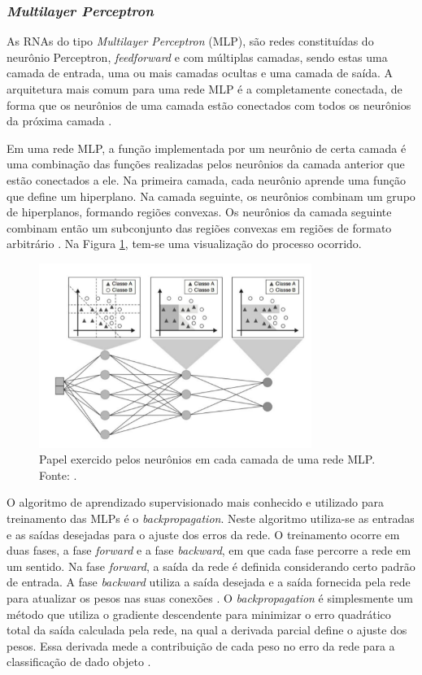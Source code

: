 \subsubsection{\emph{Multilayer Perceptron}}
\label{subsubsec:mlp}

As RNAs do tipo \emph{Multilayer Perceptron} (MLP), são redes constituídas do neurônio Perceptron, \emph{feedforward} e com múltiplas camadas, sendo estas uma camada de entrada, uma ou mais camadas ocultas e uma camada de saída. A arquitetura mais comum para uma rede MLP é a completamente conectada, de forma que os neurônios de uma camada estão conectados com todos os neurônios da próxima camada \cite{faceli}.

Em uma rede MLP, a função implementada por um neurônio de certa camada é uma combinação das funções realizadas pelos neurônios da camada anterior que estão conectados a ele. Na primeira camada, cada neurônio aprende uma função que define um hiperplano. Na camada seguinte, os neurônios combinam um grupo de hiperplanos, formando regiões convexas. Os neurônios da camada seguinte combinam então um subconjunto das regiões convexas em regiões de formato arbitrário \cite{faceli}. Na Figura \ref{fig:aprendizado-mlp}, tem-se uma visualização do processo ocorrido.


\begin{figure}[h!]
\centering
\includegraphics[height=6cm]{imgs/aprendizado-mlp}
\caption{Papel exercido pelos neurônios em cada camada de uma rede MLP. Fonte: \cite{faceli}.}
\label{fig:aprendizado-mlp}
\end{figure}

O algoritmo de aprendizado supervisionado mais conhecido e utilizado para treinamento das MLPs é o \emph{backpropagation}. Neste algoritmo utiliza-se as entradas e as saídas desejadas para o ajuste dos erros da rede. O treinamento ocorre em duas fases, a fase \emph{forward} e a fase \emph{backward}, em que cada fase percorre a rede em um sentido. Na fase \emph{forward}, a saída da rede é definida considerando certo padrão de entrada. A fase \emph{backward} utiliza a saída desejada e a saída fornecida pela rede para atualizar os pesos nas suas conexões \cite{braga}. O \emph{backpropagation} é simplesmente um método que utiliza o gradiente descendente para minimizar o erro quadrático total da saída calculada pela rede, na qual a derivada parcial define o ajuste dos pesos. Essa derivada mede a contribuição de cada peso no erro da rede para a classificação de dado objeto \cite{fausett, faceli}.

